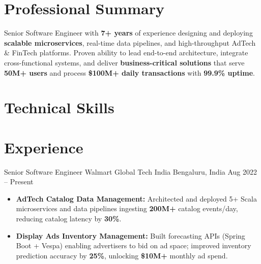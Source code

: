 \documentclass[11pt,a4paper]{moderncv}
\begin{document}
    \makecvtitle

    \section{Professional Summary}
    Senior Software Engineer with \textbf{7+ years} of experience designing and deploying \textbf{scalable microservices}, real-time data pipelines, and high-throughput AdTech \& FinTech platforms. Proven ability to lead end-to-end architecture, integrate cross-functional systems, and deliver \textbf{business-critical solutions} that serve \textbf{50M+ users} and process \textbf{\$100M+ daily transactions} with \textbf{99.9\% uptime}.

    \section{Technical Skills}

    \section{Experience}
    \cventry
    {Senior Software Engineer}
    {Walmart Global Tech India}
    {Bengaluru, India}
    {Aug 2022 -- Present}
    {
        \begin{itemize}
            \item \textbf{AdTech Catalog Data Management:} Architected and deployed 5+ Scala microservices and data pipelines ingesting \textbf{200M+} catalog events/day, reducing catalog latency by \textbf{30\%}.
            \item \textbf{Display Ads Inventory Management:} Built forecasting APIs (Spring Boot + Vespa) enabling advertisers to bid on ad space; improved inventory prediction accuracy by \textbf{25\%}, unlocking \textbf{\$10M+} monthly ad spend.
        \end{itemize}
    }
\end{document}
